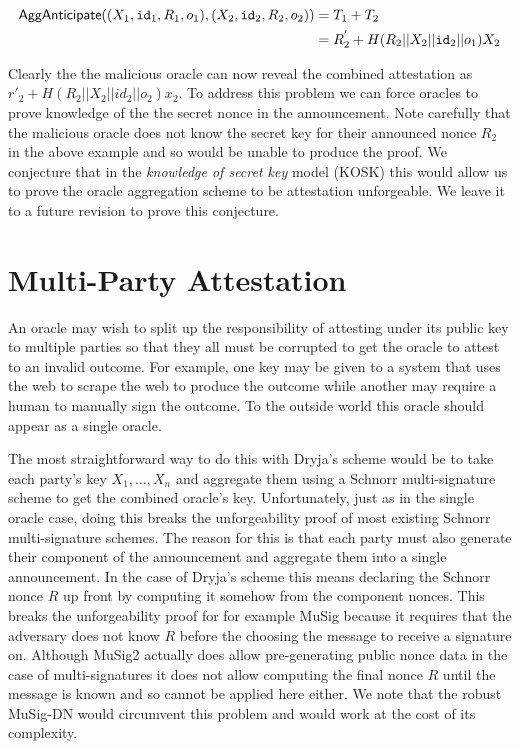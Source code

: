 \documentclass[runningheads]{llncs}
\newcommand{\eventid}{\mathtt{id}}
\newcommand{\Att}{T}
\begin{document}
\begin{align*}
\AggAnticipate((X_{1}, \eventid_{1}, R_{1}, o_{1}), (X_{2}, \eventid_{2}, R_{2}, o_{2})) & =  \Att_{1} + \Att_{2} \\
& = R^{'}_{2} + H(R_{2} || X_{2} || \eventid_2 || o_{1})X_{2}
\end{align*}

Clearly the the malicious oracle can now reveal the combined attestation as $r'_{2} + H(R_{2}||X_{2}||id_{2}|| o_{2})x_{2}$.
To address this problem we can force oracles to prove knowledge of the the secret nonce in the announcement.
Note carefully that the malicious oracle does not know the secret key for their announced nonce $R_{2}$ in the above example and so would be unable to produce the proof.
We conjecture that in the \emph{knowledge of secret key} model (KOSK) \cite{kosk} this would allow us to prove the oracle aggregation scheme to be attestation unforgeable.
We leave it to a future revision to prove this conjecture.

\section{Multi-Party Attestation}
\newcommand{\MultiKeyGen}{\textsf{MultiKeyGen}}
\newcommand{\MultiAnnounce}{\textsf{MultiAnnounce}}
\newcommand{\MultiAttest}{\textsf{MultiAttest}}

An oracle may wish to split up the responsibility of attesting under its public key to multiple parties so that they all must be corrupted to get the oracle to attest to an invalid outcome.
For example, one key may be given to a system that uses the web to scrape the web to produce the outcome while another may require a human to manually sign the outcome.
To the outside world this oracle should appear as a single oracle.

The most straightforward way to do this with Dryja's scheme would be to take each party's key $X_{1},\ldots, X_{n}$ and aggregate them using a Schnorr multi-signature scheme to get the combined oracle's key.
Unfortunately, just as in the single oracle case, doing this breaks the unforgeability proof of most existing Schnorr multi-signature schemes.
The reason for this is that each party must also generate their component of the announcement and aggregate them into a single announcement.
In the case of Dryja's scheme this means declaring the Schnorr nonce $R$ up front by computing it somehow from the component nonces.
This breaks the unforgeability proof for for example MuSig\cite{musig} because it requires that the adversary does not know $R$ before the choosing the message to receive a signature on.
Although MuSig2\cite{musig2} actually does allow pre-generating public nonce data in the case of multi-signatures it does not allow computing the final nonce $R$ until the message is known and so cannot be applied here either.
We note that the robust MuSig-DN\cite{musig-dn} would circumvent this problem and would work at the cost of its complexity.
\end{document}

